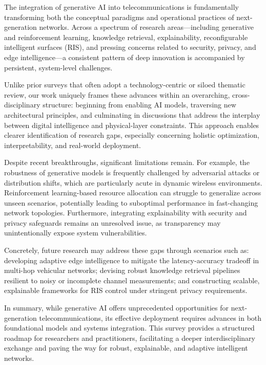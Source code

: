 \documentclass[sigconf]{acmart}
\begin{document}
The integration of generative AI into telecommunications is fundamentally transforming both the conceptual paradigms and operational practices of next-generation networks. Across a spectrum of research areas—including generative and reinforcement learning, knowledge retrieval, explainability, reconfigurable intelligent surfaces (RIS), and pressing concerns related to security, privacy, and edge intelligence—a consistent pattern of deep innovation is accompanied by persistent, system-level challenges.

Unlike prior surveys that often adopt a technology-centric or siloed thematic review, our work uniquely frames these advances within an overarching, cross-disciplinary structure: beginning from enabling AI models, traversing new architectural principles, and culminating in discussions that address the interplay between digital intelligence and physical-layer constraints. This approach enables clearer identification of research gaps, especially concerning holistic optimization, interpretability, and real-world deployment.

Despite recent breakthroughs, significant limitations remain. For example, the robustness of generative models is frequently challenged by adversarial attacks or distribution shifts, which are particularly acute in dynamic wireless environments. Reinforcement learning-based resource allocation can struggle to generalize across unseen scenarios, potentially leading to suboptimal performance in fast-changing network topologies. Furthermore, integrating explainability with security and privacy safeguards remains an unresolved issue, as transparency may unintentionally expose system vulnerabilities.

Concretely, future research may address these gaps through scenarios such as: developing adaptive edge intelligence to mitigate the latency-accuracy tradeoff in multi-hop vehicular networks; devising robust knowledge retrieval pipelines resilient to noisy or incomplete channel measurements; and constructing scalable, explainable frameworks for RIS control under stringent privacy requirements.

In summary, while generative AI offers unprecedented opportunities for next-generation telecommunications, its effective deployment requires advances in both foundational models and systems integration. This survey provides a structured roadmap for researchers and practitioners, facilitating a deeper interdisciplinary exchange and paving the way for robust, explainable, and adaptive intelligent networks.
\end{document}
